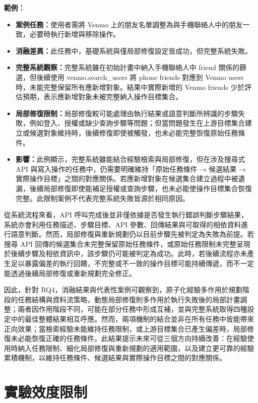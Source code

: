 \begin{ZhChapter}
\noindent\textbf{範例：}
\begin{itemize}
    \item \textbf{案例任務：}使用者需將 Venmo 上的朋友名單調整為與手機聯絡人中的朋友一致，必要時執行新增與移除操作。
    \item \textbf{消融差異：}此任務中，基礎系統與僅局部修復設定皆成功，但完整系統失敗。
    \item \textbf{完整系統觀察：}完整系統雖在初始計畫中納入手機聯絡人中 friend 關係的篩選，但後續使用 venmo.search\_users 將 phone friends 對應到 Venmo users 時，未能完整保留所有應新增對象。結果中實際新增的 Venmo friends 少於評估預期，表示應新增對象未被完整納入操作目標集合。
    \item \textbf{局部修復限制：}局部修復較可能處理由執行結果或語意判斷所辨識的步驟失敗，例如登入、授權或缺少查詢步驟等問題；但當問題發生在上游目標集合建立或候選對象維持時，後續修復即使被觸發，也未必能完整恢復原始任務條件。
    \item \textbf{影響：}此例顯示，完整系統雖能結合經驗檢索與局部修復，但在涉及搜尋式 API 與寫入操作的任務中，仍需要明確維持「原始任務條件 → 候選結果 → 實際操作目標」之間的對應關係。若應新增對象在候選集合建立過程中被遺漏，後續局部修復即使能補足授權或查詢步驟，也未必能使操作目標集合恢復完整。此限制案例不代表完整系統失敗皆源於相同原因。
\end{itemize}
從系統流程來看，API 呼叫完成後並非僅依據是否發生執行錯誤判斷步驟結果，系統亦會利用任務描述、步驟目標、API 參數、回傳結果與可取得的相依資料進行語意判斷。然而，局部修復與重新規劃仍以目前步驟先被判定為失敗為前提。若搜尋 API 回傳的候選集合未完整保留原始任務條件，或原始任務限制未完整呈現於後續步驟及相依資訊中，該步驟仍可能被判定為成功。此時，若後續流程亦未產生足以暴露偏差的執行回饋，不完整或不一致的操作目標可能持續傳遞，而不一定能透過後續局部修復或重新規劃完全修正。

因此，針對 RQ4，消融結果與代表性案例可觀察到，原子化經驗多作用於規劃階段的任務結構與資料流策略，動態局部修復則多作用於執行失敗後的局部計畫調整；兩者因作用階段不同，可能在部分任務中形成互補，並與完整系統取得四種設定中的最佳整體結果相互呼應。然而，兩項機制的結合並非在所有任務中皆能帶來正向效果；當檢索經驗未能維持任務限制，或上游目標集合已產生偏差時，局部修復未必能恢復正確的任務條件。此結果提示未來可從三個方向持續改善：在經驗使用時納入任務限制、細化局部修復與重新規劃的適用範圍，以及建立更可靠的經驗累積機制，以維持任務條件、候選結果與實際操作目標之間的對應關係。

\section{實驗效度限制}


\end{ZhChapter}

